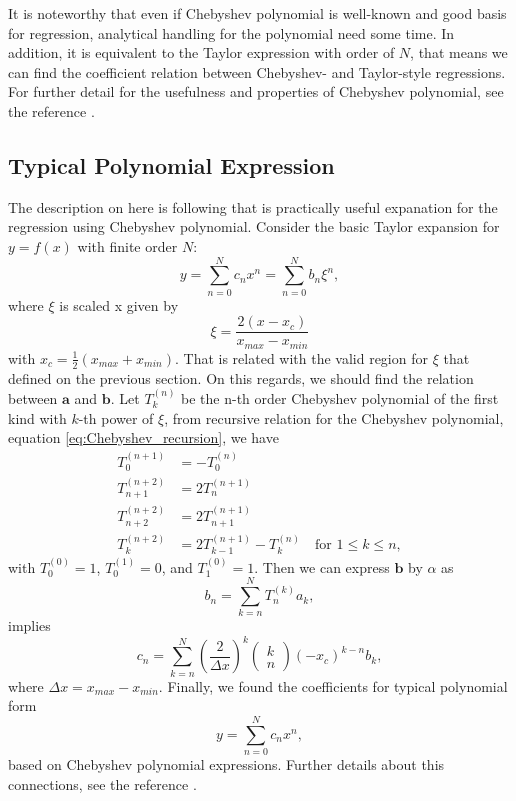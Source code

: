 \documentclass[10pt, a4paper]{article}
\begin{document}
\begin{appendices}
  It is noteworthy that even if Chebyshev polynomial is well-known and good basis for regression, analytical handling for the polynomial need some time. In addition, it is equivalent to the Taylor expression with order of $N$, that means we can find the coefficient relation between Chebyshev- and Taylor-style regressions.
  For further detail for the usefulness and properties of Chebyshev polynomial, see the reference \textcite{arfken2008mathematical}.


  \subsection{Typical Polynomial Expression}
  The description on here is following \textcite{SooCho:2013bg} that is practically useful expanation for the regression using Chebyshev polynomial.
  Consider the basic Taylor expansion for $y=f(x)$ with finite order $N$:
  \begin{equation}
    y = \sum_{n=0}^{N} c_n x^n = \sum_{n=0}^{N} b_n\xi^n,
  \end{equation}
  where $\xi$ is scaled x given by
  \begin{equation}
    \xi = \frac{2(x - x_c)}{x_{max} - x_{min}}
  \end{equation}
  with $x_c = \frac{1}{2}(x_{max} + x_{min})$. That is related with the valid region for $\xi$ that defined on the previous section. On this regards, we should find the relation between $\mathbf{a}$ and $\mathbf{b}$.
  Let $T^{(n)}_{k}$ be the n-th order Chebyshev polynomial of the first kind with $k$-th power of $\xi$, from recursive relation for the Chebyshev polynomial, equation \eqref{eq:Chebyshev_recursion}, we have
  \begin{align}
    T_0^{(n+1)} &= -T_0^{(n)} \\
    T_{n+1}^{(n+2)} &= 2T_{n}^{(n+1)} \\
    T_{n+2}^{(n+2)} &= 2T_{n+1}^{(n+1)} \\
    T_k^{(n+2)} &= 2T_{k-1}^{(n+1)}-T_k^{(n)}\quad\textrm{for }1\leq k\leq n,
  \end{align}
  with $T_0^{(0)}=1$, $T_0^{(1)}=0$, and $T_1^{(0)} = 1$. Then we can express $\mathbf{b}$ by $\alpha$ as
  \begin{equation}
    b_n = \sum_{k=n}^{N}T_n^{(k)}a_k,
  \end{equation}
  implies
  \begin{equation}
    c_n = \sum_{k=n}^{N}\left(\frac{2}{\Delta x}\right)^k\left(\begin{array}{c} k \\ n \end{array}\right)\left(-x_c\right)^{k-n}b_k,
  \end{equation}
  where $\Delta x = x_{max} - x_{min}$.
  Finally, we found the coefficients for typical polynomial form
  \begin{equation}
    y = \sum_{n=0}^{N}c_nx^n,
  \end{equation}
  based on Chebyshev polynomial expressions.
  Further details about this connections, see the reference \textcite{SooCho:2013bg}.


\end{appendices}
\end{document}
